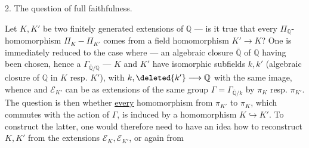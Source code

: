 2. The question of full faithfulness.

Let $K,K'$ be two finitely generated extensions of $\mathbb Q$ --- is it true that every $\Pi_{\mathbb Q}$-homomorphism $\Pi_K-\Pi_{K'}$ comes from a field homomorphism $K'\longrightarrow K$? One is immediately reduced to the case where --- an algebraic closure $\overline{\mathbb Q}$ of $\mathbb Q$ having been chosen, hence a $\Gamma_{\overline{\mathbb Q}/\mathbb Q}$ --- $K$ and $K'$ have isomorphic subfields $k,k'$ (algebraic closure of $\mathbb Q$ in $K$ resp. $K'$), with   $k,\deleted{k'}\longrightarrow\mathbb Q$ with the same image, whence  and $\mathcal E_{K'}$ can be  as extensions of the same group $\Gamma=\Gamma_{\overline{\mathbb Q}/k}$ by $\pi_K$ resp. $\pi_{K'}$. The question is then whether \uline{every} homomorphism from $\pi_{K'}$ to $\pi_K$, which commutes with the action of $\Gamma$, is induced by a homomorphism $K\hookrightarrow K'$. To construct the latter, one would therefore need to have an idea how to reconstruct $K,K'$ from the extensions $\mathcal E_K,\mathcal E_{K'}$, or again from
